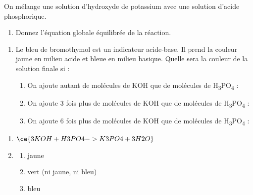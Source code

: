 \documentclass[
  11pt,
  a4paper,
  openany]{book}
\providecommand{\tightlist}{%
  \setlength{\itemsep}{0pt}\setlength{\parskip}{0pt}}
\begin{document}
\begin{Exercise}

On mélange une solution d'hydroxyde de potassium avec une solution d'acide phosphorique.

\begin{enumerate}
\def\labelenumi{\arabic{enumi}.}
\tightlist
\item
  Donnez l'équation globale équilibrée de la réaction.
\end{enumerate}

\vspace{2em}

\begin{enumerate}
\def\labelenumi{\arabic{enumi}.}
\setcounter{enumi}{1}
\item
  Le bleu de bromothymol est un indicateur acide-base. Il prend la couleur jaune en milieu acide et bleue en milieu basique. Quelle sera la couleur de la solution finale si :

  \begin{enumerate}
  \def\labelenumii{\alph{enumii}.}
  \tightlist
  \item
    On ajoute autant de molécules de KOH que de molécules de H\textsubscript{3}PO\textsubscript{4} :
  \item
    On ajoute 3 fois plus de molécules de KOH que de molécules de H\textsubscript{3}PO\textsubscript{4} :
  \item
    On ajoute 6 fois plus de molécules de KOH que de molécules de H\textsubscript{3}PO\textsubscript{4} :
  \end{enumerate}
\end{enumerate}

\end{Exercise}

\begin{Answer}

\begin{enumerate}
\def\labelenumi{\arabic{enumi}.}
\item
  \(\ce{ 3 KOH + H3PO4 -> K3PO4 + 3 H2O }\)
\item
  \begin{enumerate}
  \def\labelenumii{\alph{enumii}.}
  \tightlist
  \item
    jaune
  \item
    vert (ni jaune, ni bleu)
  \item
    bleu
  \end{enumerate}
\end{enumerate}

\end{Answer}
\end{document}
